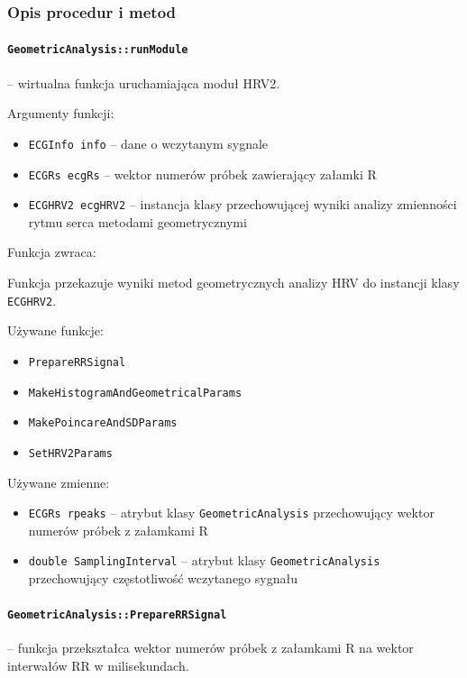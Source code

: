 \documentclass[a4paper, 11pt]{article}
\begin{document}
\subsubsection{Opis procedur i metod }
\label{sec:hrv2:procs}

\paragraph{\texttt{GeometricAnalysis::runModule}} -- wirtualna funkcja uruchamiająca moduł HRV2.

\medskip{}


Argumenty funkcji:
\begin{itemize}
\item \verb+ECGInfo info+ -- dane o wczytanym sygnale
\item \verb+ECGRs ecgRs+ -- wektor numerów próbek zawierający załamki R
\item \verb+ECGHRV2 ecgHRV2+ -- instancja klasy przechowującej wyniki analizy zmienności
rytmu serca metodami geometrycznymi
\end{itemize}
\medskip{}


Funkcja zwraca:

Funkcja przekazuje wyniki metod geometrycznych analizy HRV do instancji
klasy \verb+ECGHRV2+.

\medskip{}


Używane funkcje:
\begin{itemize}
\item \verb+PrepareRRSignal+
\item \verb+MakeHistogramAndGeometricalParams+
\item \verb+MakePoincareAndSDParams+
\item \verb+SetHRV2Params+\medskip{}

\end{itemize}
Używane zmienne:
\begin{itemize}
\item \verb+ECGRs rpeaks+ -- atrybut klasy \verb+GeometricAnalysis+ przechowujący wektor
numerów próbek z załamkami R
\item \verb+double SamplingInterval+ -- atrybut klasy \verb+GeometricAnalysis+ przechowujący
częstotliwość wczytanego sygnału
\end{itemize}


\medskip{}

\paragraph{\texttt{GeometricAnalysis::PrepareRRSignal}} -- funkcja przekształca wektor numerów próbek z załamkami R na wektor
interwałów RR w milisekundach.
\end{document}
